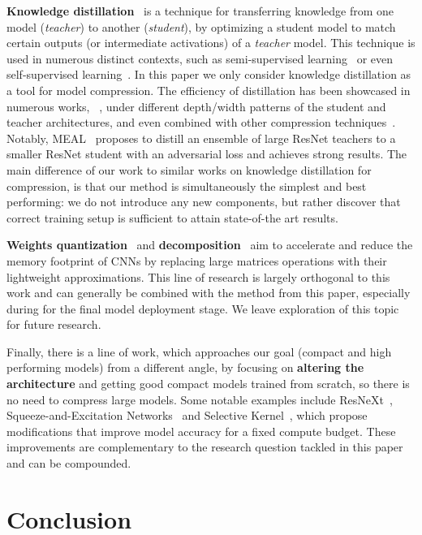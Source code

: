 \documentclass[10pt,twocolumn,letterpaper]{article}
\begin{document}
\textbf{Knowledge distillation}~\cite{hinton} is a technique for transferring knowledge from one model (\emph{teacher}) to another (\emph{student}), by optimizing a student model to match certain outputs (or intermediate activations) of a \emph{teacher} model. This technique is used in numerous distinct contexts, such as semi-supervised learning~\cite{tarvainen2017mean,xie2020self} or even self-supervised learning~\cite{grill2020bootstrap}. In this paper we only consider knowledge distillation as a tool for model compression.
The efficiency of distillation has been showcased in numerous works, \eg~\cite{Cho_2019_ICCV,Romero15fitnets:hints}, under different depth/width patterns of the student and teacher architectures, and even combined with other compression techniques~\cite{Mishra2018ApprenticeUK}. Notably, MEAL~\cite{shen2020mealv2} proposes to distill an ensemble of large ResNet teachers to a smaller ResNet student with an adversarial loss and achieves strong results. The main difference of our work to similar works on knowledge distillation for compression, is that our method is simultaneously the simplest and best performing: we do not introduce any new components, but rather discover that correct training setup is sufficient to attain state-of-the art results.

\textbf{Weights quantization}~\cite{lin2016fixed, jacob2018quantization, park2017weighted, wu2020integer} and \textbf{decomposition}~\cite{denton2014exploiting, lebedev2014speeding, wang2019eigendamage, gusak2019automated} aim to accelerate and reduce the memory footprint of CNNs by replacing large matrices operations with their lightweight approximations. This line of research is largely orthogonal to this work and can generally be combined with the method from this paper, especially during for the final model deployment stage. We leave exploration of this topic for future research. 

Finally, there is a line of work, which approaches our goal (compact and high performing models) from a different angle, by focusing on \textbf{altering the architecture} and getting good compact models trained from scratch, so there is no need to compress large models. Some notable examples include ResNeXt~\cite{resnext}, Squeeze-and-Excitation Networks~\cite{SEnet} and Selective Kernel~\cite{SKnet}, which propose modifications that improve model accuracy for a fixed compute budget. These improvements are complementary to the research question tackled in this paper and can be compounded.

\section{Conclusion}\label{sec:conclusion}
\end{document}
